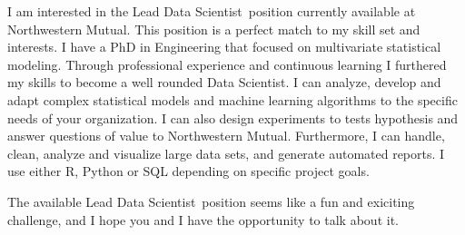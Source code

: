 \documentclass[11pt, letterpaper]{awesome-cv}
\newcommand{\openPosition}{Lead Data Scientist}
\newcommand{\company}{Northwestern Mutual}
\begin{document}
\makecvheader[R]


\makelettertitle

\begin{cvletter}

I am interested in the \openPosition~position currently available at \company. This position is a perfect match to my skill set and interests. I have a PhD in Engineering that focused on multivariate statistical modeling. Through professional experience and continuous learning I furthered my skills to become a well rounded Data Scientist. I can analyze, develop and adapt complex statistical models and machine learning algorithms to the specific needs of your organization. I can also design experiments to tests hypothesis and answer questions of value to \company. Furthermore, I can handle, clean, analyze and visualize large data sets, and generate automated reports. I use either R, Python or SQL depending on specific project goals.

The available \openPosition~position seems like a fun and exiciting challenge, and I hope you and I have the opportunity to talk about it.




\end{cvletter}
\end{document}
